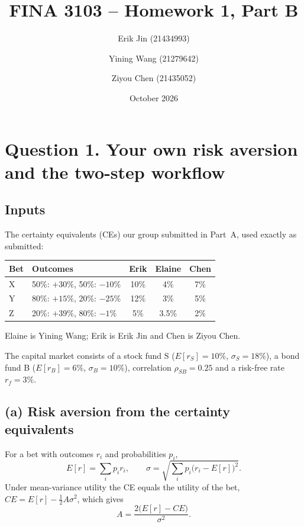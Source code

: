 \documentclass[11pt]{article}
\title{FINA 3103 -- Homework 1, Part B}
\author{Erik Jin (21434993) \and Yining Wang (21279642) \and Ziyou Chen (21435052)}
\date{October 2026}
\begin{document}
\maketitle

\section*{Question 1. Your own risk aversion and the two-step workflow}

\subsection*{Inputs}

The certainty equivalents (CEs) our group submitted in Part~A, used exactly as submitted:

\begin{center}
\begin{tabular}{llccc}
\toprule
Bet & Outcomes & Erik & Elaine & Chen \\
\midrule
X & 50\%: $+30\%$, 50\%: $-10\%$ & 10\% & 4\% & 7\% \\
Y & 80\%: $+15\%$, 20\%: $-25\%$ & 12\% & 3\% & 5\% \\
Z & 20\%: $+39\%$, 80\%: $-1\%$  & 5\%  & 3.5\% & 2\% \\
\bottomrule
\end{tabular}
\end{center}

Elaine is Yining Wang; Erik is Erik Jin and Chen is Ziyou Chen.

The capital market consists of a stock fund S ($E[r_S] = 10\%$, $\sigma_S = 18\%$), a bond fund B ($E[r_B] = 6\%$, $\sigma_B = 10\%$), correlation $\rho_{SB} = 0.25$ and a risk-free rate $r_f = 3\%$.

\subsection*{(a) Risk aversion from the certainty equivalents}

For a bet with outcomes $r_i$ and probabilities $p_i$,
\[
E[r] = \sum_i p_i r_i, \qquad \sigma = \sqrt{\sum_i p_i \bigl(r_i - E[r]\bigr)^2}.
\]
Under mean-variance utility the CE equals the utility of the bet, $CE = E[r] - \tfrac12 A\sigma^2$, which gives
\[
A = \frac{2\bigl(E[r] - CE\bigr)}{\sigma^2}.
\]
\end{document}
